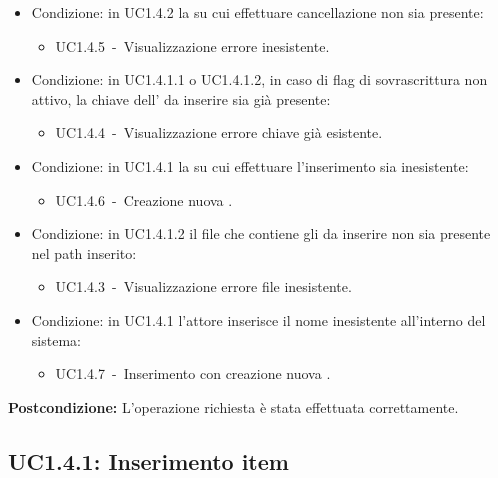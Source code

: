 \documentclass{scalatekids-article}
\begin{document}
\begin{itemize}
\item Condizione: in UC1.4.2 la  su cui effettuare cancellazione non sia presente:
  \begin{itemize}
  \item UC1.4.5\ -\ Visualizzazione errore  inesistente.
  \end{itemize}
\item Condizione: in UC1.4.1.1 o UC1.4.1.2, in caso di flag di sovrascrittura non attivo, la chiave dell' da inserire sia già presente:
  \begin{itemize}
  \item UC1.4.4\ -\ Visualizzazione errore chiave già esistente.
  \end{itemize}
\item Condizione: in UC1.4.1 la  su cui effettuare l'inserimento sia inesistente:
  \begin{itemize}
  \item UC1.4.6\ -\ Creazione nuova .
  \end{itemize}
\item Condizione: in UC1.4.1.2  il file che contiene gli  da inserire non sia presente nel path inserito:
  \begin{itemize}
  \item UC1.4.3\ -\ Visualizzazione errore file inesistente.
  \end{itemize}
\item Condizione: in UC1.4.1 l'attore inserisce il nome  inesistente all'interno del sistema:
  \begin{itemize}
  \item UC1.4.7\ -\ Inserimento con creazione nuova .
  \end{itemize}
\end{itemize}
\textbf{Postcondizione:} L'operazione richiesta è stata effettuata correttamente.

\subsection{UC1.4.1: Inserimento item}
\end{document}
